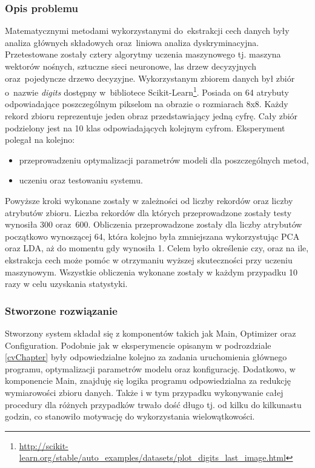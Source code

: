 \subsubsection{Opis problemu}
Matematycznymi metodami wykorzystanymi do~ekstrakcji cech danych były analiza głównych składowych oraz~liniowa analiza dyskryminacyjna. Przetestowane zostały cztery algorytmy uczenia maszynowego tj. maszyna wektorów nośnych, sztuczne sieci neuronowe, las drzew decyzyjnych oraz~pojedyncze drzewo decyzyjne. Wykorzystanym zbiorem danych był zbiór o~nazwie \textit{digits} dostępny w~bibliotece Scikit-Learn\footnote{\url{http://scikit-learn.org/stable/auto_examples/datasets/plot_digits_last_image.html}}. Posiada on 64 atrybuty odpowiadające poszczególnym pikselom na obrazie o rozmiarach 8x8. Każdy rekord zbioru reprezentuje jeden obraz przedstawiający jedną cyfrę. Cały zbiór podzielony jest na 10 klas odpowiadających kolejnym cyfrom. Eksperyment polegał na kolejno:
\begin{itemize}

\item przeprowadzeniu optymalizacji parametrów modeli dla poszczególnych metod,
\item uczeniu oraz testowaniu systemu.

\end{itemize}

Powyższe kroki wykonane zostały w zależności od liczby rekordów oraz liczby atrybutów zbioru. Liczba rekordów dla których przeprowadzone zostały testy wynosiła 300 oraz~600. Obliczenia przeprowadzone zostały dla liczby atrybutów początkowo wynoszącej 64, która kolejno była zmniejszana wykorzystując PCA oraz LDA, aż do momentu gdy wynosiła 1. Celem było określenie czy, oraz na ile, ekstrakcja cech może pomóc w otrzymaniu wyższej skuteczności przy uczeniu maszynowym. Wszystkie obliczenia wykonane zostały w każdym przypadku 10 razy w celu uzyskania statystyki.

\subsubsection{Stworzone rozwiązanie}
Stworzony system składał się z komponentów takich jak Main, Optimizer oraz Configuration. Podobnie jak w eksperymencie opisanym w podrozdziale \ref{cvChapter} były odpowiedzialne kolejno za zadania uruchomienia głównego programu, optymalizacji parametrów modelu oraz konfigurację. Dodatkowo, w komponencie Main, znajduję się logika programu odpowiedzialna za redukcję wymiarowości zbioru danych. Także i w tym przypadku wykonywanie całej procedury dla różnych przypadków trwało dość długo tj. od kilku do kilkunastu godzin, co stanowiło motywację do wykorzystania wielowątkowości.

